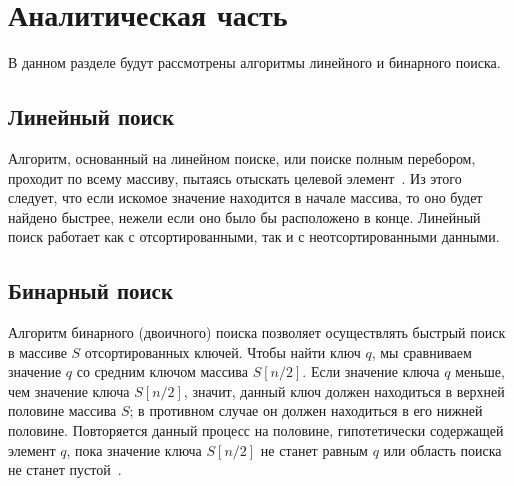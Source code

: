 \section{Аналитическая часть}

В данном разделе будут рассмотрены алгоритмы линейного и бинарного поиска.

\subsection{Линейный поиск}

Алгоритм, основанный на линейном поиске, или поиске полным перебором, проходит по всему массиву, пытаясь отыскать целевой элемент~\cite{stivens}. Из этого следует, что если искомое значение находится в начале массива, то оно будет найдено быстрее, нежели если оно было бы расположено в конце. Линейный поиск работает как с отсортированными, так и с неотсортированными данными.

\subsection{Бинарный поиск}

Алгоритм бинарного (двоичного) поиска позволяет осуществлять быстрый поиск в массиве $S$ отсортированных ключей. Чтобы найти ключ $q$, мы сравниваем значение $q$ со средним
ключом массива $S[n/2]$. Если значение ключа $q$ меньше, чем значение ключа $S[n/2]$,
значит, данный ключ должен находиться в верхней половине массива $S$; в противном
случае он должен находиться в его нижней половине. Повторяется данный процесс на половине, гипотетически содержащей элемент $q$, пока значение ключа $S[n/2]$ не станет равным $q$ или область поиска не станет пустой~\cite{skiena}.

